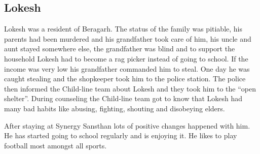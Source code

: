 \subsection{Lokesh}
Lokesh was a resident of Beragarh. The status of the family was pitiable, his parents had been murdered and his grandfather took care of him, his uncle and aunt stayed somewhere else, the grandfather was blind and to support the household Lokesh had to become a rag picker instead of going to school. If the income was very low his grandfather commanded him to steal. One day he was caught stealing and the shopkeeper took him to the police station. The police then informed the Child-line team about Lokesh and they took him to the ``open shelter''. During counseling the Child-line team got to know that Lokesh had many bad habits like abusing, fighting, shouting and disobeying elders.



After staying at Synergy Sansthan lots of positive changes happened with him. He has started going to school regularly and is enjoying it. He likes to play football most amongst all sports. 





